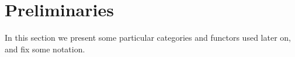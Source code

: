 \documentclass[envcountsame]{llncs}
\begin{document}
  
\begin{comment}
 
 A first difference to the inductive case of the lambda calculus springs to mind:
 while the lambda calculus is essentially a monad---hence an \emph{endo}functor---on sets, the codata type $\Tri$ cannot be considered as such;
 for a given set $A$, the type $\Tri A$, equipped with its canonical \fat{bisimilarity} relation, 
 constitutes a \emph{setoid}---a set equipped with an equivalence relation---rather than a set.
 Instead of considering comonads---as the dual notion to monads---we thus have to consider a notion of comonad whose underlying functor is not necessarily endo.
 This is precisely the raison d'\^etre of \emph{relative} comonads (defined below)---the dual notion to the relative monads defined in 
  \parencite{DBLP:conf/fossacs/AltenkirchCU10}. 
 Fortunately, relative comonads have all the nice properties we could ask for; 
 in particular, the notion of module over a monad of \parencite{DBLP:journals/iandc/HirschowitzM10} extends to modules over \emph{relative} monads
 \parencite{ahrens_relmonads}, which can be dualized to obtain comodules over relative comonads.
 
 The other, more important difference between the inductive and the coinductive case stems from \emph{heterogeneity}:
 Two dual operations are responsible for the heterogeneity of the data type of lambda terms and the codata type of infinite triangular
 matrices: while we precompose with taking a \emph{co}product in the case of the abstraction of the lambda calculus---in order to account
 for context extension when passing under a binder---,
 we precompose with taking a \emph{product} when giving the target of the $\tail$ destructor of $\Tri$.
 However, as it turns out, the treatment of the $\tail$ destructor is far more complicated than a dualization of that of the abstraction 
 constructor of the lambda calculus---see \Cref{rem:shift} for a detailed explanation. 
 Describing our approach to a category-theoretic treatment of the $\tail$ destructor is the main purpose of the present work.
\end{comment} 
 
 
 

\section{Preliminaries}\label{sec:preliminaries}

In this section we present some particular categories and functors used later on, and fix some notation.
\end{document}
